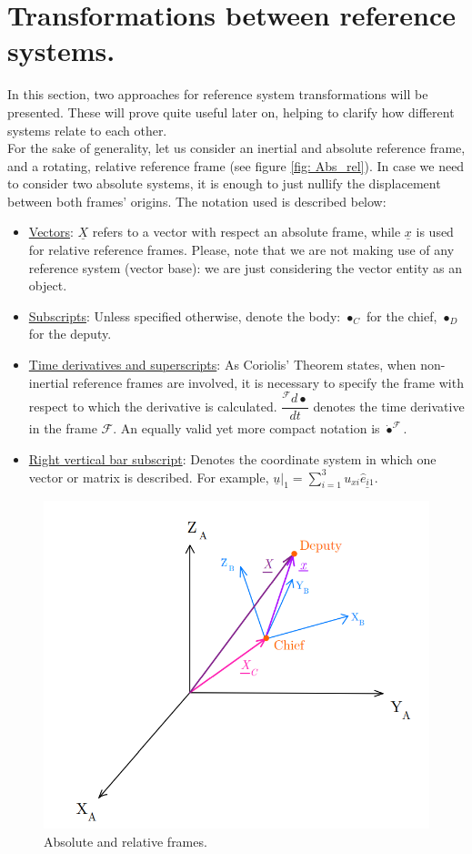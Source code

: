 \section{Transformations between reference systems.}
%
\indent In this section, two approaches for reference system transformations will be presented. These will prove quite useful later on, helping to clarify how different systems relate to each other. \\
%
\indent For the sake of generality, let us consider an inertial and absolute reference frame, and a rotating, relative reference frame (see figure \ref{fig:	Abs_rel}). In case we need to consider two absolute systems, it is enough to just nullify the displacement between both frames' origins. The notation used is described below:
%
\begin{itemize}
%
\item \underline{Vectors}: $\underline{X}$ refers to a vector with respect an absolute frame, while $\underline{x}$ is used for relative reference frames. Please, note that we are not making use of any reference system (\ie vector base): we are just considering the vector entity as an object.
%
\item \underline{Subscripts}: Unless specified otherwise, denote the body: $\bullet_{C}$ for the chief, $\bullet_D$ for the deputy.
%
\item \underline{Time derivatives and superscripts}: As Coriolis' Theorem states, when non-inertial reference frames are involved, it is necessary to specify the frame with respect to which the derivative is calculated. $\dfrac{^{\mathcal{F}} d \bullet}{dt}$ denotes the time derivative in the frame $\mathcal{F}$. An equally valid yet more compact notation is $\dot{\bullet}^{\mathcal{F}}$. 
%
\item \underline{Right vertical bar subscript}: Denotes the coordinate system in which one vector or matrix is described. For example, $\underline{u}\rvert_{1} = \sum_{i=1}^3 u_{xi} \underline{\hat{e}_{i1}} $.
%
\end{itemize}
%
%
\begin{figure}[!htb]
\centering\includegraphics[width = 0.5\linewidth]{Appendices/Appendix_B/Abs_rel}
\caption{Absolute and relative frames.}
\label{fig:	Abs_rel}
\end{figure}
